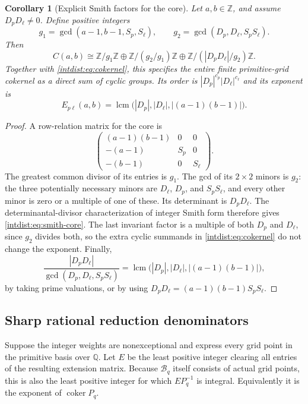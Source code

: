 \documentclass[11pt,a4paper]{article}
\numberwithin{equation}{section}
\theoremstyle{plain}
\newtheorem{corollary}[theorem]{Corollary}
\theoremstyle{definition}
\theoremstyle{remark}
\begin{document}
\begin{corollary}[Explicit Smith factors for the core]
\label{intdist:cor:smith}
Let $a,b\in\mathbb Z$, and assume $D_pD_\ell\ne0$. Define positive
integers
\[
 g_1=\gcd(a-1,b-1,S_p,S_\ell),\qquad
 g_2=\gcd(D_p,D_\ell,S_pS_\ell).
\]
Then
\begin{equation}\label{intdist:eq:smith-core}
 C(a,b)\cong
 \mathbb Z/g_1\mathbb Z\oplus
 \mathbb Z/(g_2/g_1)\mathbb Z\oplus
 \mathbb Z/(|D_pD_\ell|/g_2)\mathbb Z.
\end{equation}
Together with \eqref{intdist:eq:cokernel}, this specifies the entire
finite primitive-grid cokernel as a direct sum of cyclic groups.
Its order is
$|D_p|^{c_p}|D_\ell|^{c_\ell}$ and its exponent is
\begin{equation}\label{intdist:eq:exponent}
 \boxed{\displaystyle
 E_{p\ell}(a,b)=
 \operatorname{lcm}\bigl(|D_p|,|D_\ell|,|(a-1)(b-1)|\bigr).}
\end{equation}
\end{corollary}

\begin{proof}
A row-relation matrix for the core is
\[
 \begin{pmatrix}
 (a-1)(b-1)&0&0\\
 -(a-1)&S_p&0\\
 -(b-1)&0&S_\ell
 \end{pmatrix}.
\]
The greatest common divisor of its entries is $g_1$. The gcd of its
$2\times2$ minors is $g_2$: the three potentially necessary minors
are $D_\ell$, $D_p$, and $S_pS_\ell$, and every other minor is zero or
a multiple of one of these. Its determinant is $D_pD_\ell$.
The determinantal-divisor characterization of integer Smith form
therefore gives \eqref{intdist:eq:smith-core}.
The last invariant factor is a multiple of both $D_p$ and $D_\ell$,
since $g_2$ divides both, so the extra cyclic summands in
\eqref{intdist:eq:cokernel} do not change the exponent. Finally,
\[
 \frac{|D_pD_\ell|}{\gcd(D_p,D_\ell,S_pS_\ell)}
 =\operatorname{lcm}\bigl(|D_p|,|D_\ell|,|(a-1)(b-1)|\bigr),
\]
by taking prime valuations, or by using
$D_pD_\ell=(a-1)(b-1)S_pS_\ell$.
\end{proof}

\subsection{Sharp rational reduction denominators}

Suppose the integer weights are nonexceptional and express every grid
point in the primitive basis over $\mathbb Q$. Let $E$ be the least
positive integer clearing all entries of the resulting extension
matrix. Because $\mathcal B_q$ itself consists of actual grid points,
this is also the least positive integer for which
$E P_q^{-1}$ is integral. Equivalently it is the exponent of
$\operatorname{coker}P_q$.
\end{document}
